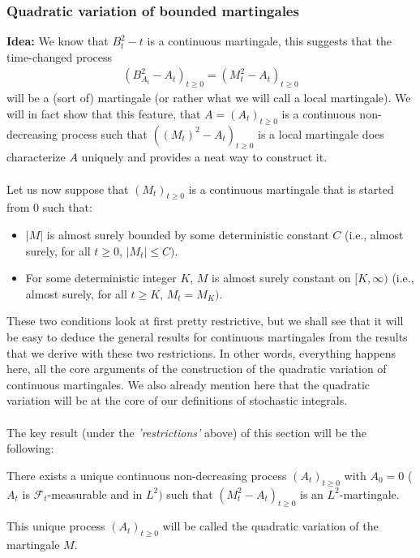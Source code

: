 \documentclass[../mainfile.tex]{subfiles}
\begin{document}
\subsubsection{Quadratic variation of bounded martingales}
\textbf{Idea:} We know that $B_t^2 -t$ is a continuous martingale, this suggests that the time-changed process 
\begin{align*}
(B_{A_t}^2-A_t)_{t \geq 0}=(M_t^2-A_t)_{t \geq 0}
\end{align*}
will be a (sort of) martingale (or rather what we will call a local martingale). We will in fact show that this feature, that $A=(A_t)_{t \geq 0}$ is a continuous non-decreasing process such that $((M_t)^2-A_t)_{t \geq 0}$ is a local martingale does characterize $A$ uniquely and provides a neat way to construct it. 
\\\\
Let us now suppose that $(M_t)_{t \geq 0}$ is a continuous martingale that is started from $0$ such that: 
\begin{itemize}
\item $|M|$ is almost surely bounded by some deterministic constant $C$ (i.e., almost surely, for all $t \geq 0$, $|M_t| \leq C)$. 
\item For some deterministic integer $K$, $M$ is almost surely constant on $[K, \infty)$ (i.e., almost surely,  for all $t \geq K$, $M_t=M_K)$. 
\end{itemize}
These two conditions look at first pretty restrictive, but we shall see that it will be easy to deduce the general results for continuous martingales from the results that we derive with these two restrictions. In other words,  everything happens here, all the core arguments of the construction of the quadratic variation of continuous martingales. We also already mention here that the quadratic variation will be at the core of our definitions of stochastic integrals. 
\\\\
The key result (under the \textit{'restrictions'} above) of this section will be the following:
\begin{prop} There exists a unique continuous non-decreasing process $(A_t)_{t \geq 0}$ with $A_0=0$ ($A_t$ is $\mathcal{F}_t$-measurable and in $L^2)$ such that $(M_t^2-A_t)_{t \geq 0}$ is an $L^2$-martingale. 
\end{prop}
\begin{defn} This unique process $(A_t)_{t \geq 0}$ will be called the quadratic variation of the martingale $M$.
\end{defn}
\end{document}
